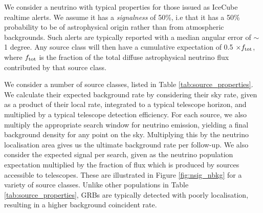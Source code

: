 We consider a neutrino with typical properties for those issued as IceCube realtime alerts. We assume it has a \emph{signalness} of 50\%, i.e that it has a 50\% probability to be of astrophysical origin rather than from atmospheric backgrounds. Such alerts are typically reported with a median angular error of $\sim$1 degree. Any source class will then have a cumulative expectation of 0.5 $\times f_{\textup{tot}}$, where $f_{\textup{tot}}$ is the fraction of the total diffuse astrophysical neutrino flux contributed by that source class. 
		
We consider a number of source classes, listed in Table \ref{tab:source_properties}. We calculate their expected background rate by considering their sky rate, given as a product of their local rate, integrated to a typical telescope horizon, and multiplied by a typical telescope detection efficiency. For each source, we also multiply the appropriate search window for neutrino emission, yielding a final background density for any point on the sky. Multiplying this by the neutrino localisation area gives us the ultimate background rate per follow-up. We also consider the expected signal per search, given as the neutrino population expectation multiplied by the fraction of flux which is produced by sources accessible to telescopes. These are illustrated in Figure \ref{fig:nsig_nbkg} for a variety of source classes. Unlike other populations in Table  \ref{tab:source_properties}, GRBs are typically detected with poorly localisation, resulting in a higher background coincident rate.


